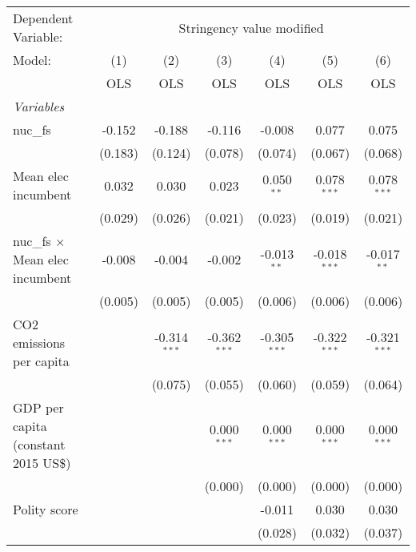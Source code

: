 
\begingroup
\centering
\begin{tabular}{lcccccc}
   \toprule
   Dependent Variable: & \multicolumn{6}{c}{Stringency value modified}\\
   Model:                                 & (1)     & (2)            & (3)            & (4)            & (5)            & (6)\\  
                                          &  OLS    & OLS            & OLS            & OLS            & OLS            & OLS\\  
   \midrule
   \emph{Variables}\\
   nuc\_fs                                & -0.152  & -0.188         & -0.116         & -0.008         & 0.077          & 0.075\\   
                                          & (0.183) & (0.124)        & (0.078)        & (0.074)        & (0.067)        & (0.068)\\   
   Mean elec incumbent                    & 0.032   & 0.030          & 0.023          & 0.050$^{**}$   & 0.078$^{***}$  & 0.078$^{***}$\\   
                                          & (0.029) & (0.026)        & (0.021)        & (0.023)        & (0.019)        & (0.021)\\   
   nuc\_fs $\times$ Mean elec incumbent   & -0.008  & -0.004         & -0.002         & -0.013$^{**}$  & -0.018$^{***}$ & -0.017$^{**}$\\   
                                          & (0.005) & (0.005)        & (0.005)        & (0.006)        & (0.006)        & (0.006)\\   
   CO2 emissions per capita               &         & -0.314$^{***}$ & -0.362$^{***}$ & -0.305$^{***}$ & -0.322$^{***}$ & -0.321$^{***}$\\   
                                          &         & (0.075)        & (0.055)        & (0.060)        & (0.059)        & (0.064)\\   
   GDP per capita (constant 2015 US\$)    &         &                & 0.000$^{***}$  & 0.000$^{***}$  & 0.000$^{***}$  & 0.000$^{***}$\\   
                                          &         &                & (0.000)        & (0.000)        & (0.000)        & (0.000)\\   
   Polity score                           &         &                &                & -0.011         & 0.030          & 0.030\\   
                                          &         &                &                & (0.028)        & (0.032)        & (0.037)\\   

\end{tabular}
